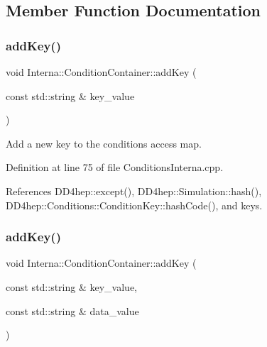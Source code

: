 \subsection{Member Function Documentation}
\hypertarget{class_d_d4hep_1_1_conditions_1_1_interna_1_1_condition_container_ab736d477be5f0407bb0ad663e2e7401b}{}\label{class_d_d4hep_1_1_conditions_1_1_interna_1_1_condition_container_ab736d477be5f0407bb0ad663e2e7401b} 
\subsubsection{\texorpdfstring{add\+Key()}{addKey()}\hspace{0.1cm}{\footnotesize\ttfamily [1/2]}}
{\footnotesize\ttfamily void Interna\+::\+Condition\+Container\+::add\+Key (\begin{DoxyParamCaption}\item[{const std\+::string \&}]{key\+\_\+value }\end{DoxyParamCaption})}



Add a new key to the conditions access map. 



Definition at line 75 of file Conditions\+Interna.\+cpp.



References D\+D4hep\+::except(), D\+D4hep\+::\+Simulation\+::hash(), D\+D4hep\+::\+Conditions\+::\+Condition\+Key\+::hash\+Code(), and keys.

\hypertarget{class_d_d4hep_1_1_conditions_1_1_interna_1_1_condition_container_aaff72767a947def90f6e9b16befca08d}{}\label{class_d_d4hep_1_1_conditions_1_1_interna_1_1_condition_container_aaff72767a947def90f6e9b16befca08d} 
\subsubsection{\texorpdfstring{add\+Key()}{addKey()}\hspace{0.1cm}{\footnotesize\ttfamily [2/2]}}
{\footnotesize\ttfamily void Interna\+::\+Condition\+Container\+::add\+Key (\begin{DoxyParamCaption}\item[{const std\+::string \&}]{key\+\_\+value,  }\item[{const std\+::string \&}]{data\+\_\+value }\end{DoxyParamCaption})}



